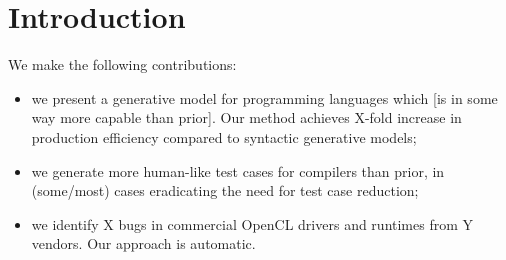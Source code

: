 \section{Introduction}\label{sec:intro}

We make the following contributions:
%
\begin{itemize}
\item we present a generative model for programming languages which [is in some way more capable than prior]. Our method achieves X-fold increase in production efficiency compared to syntactic generative models;
\item we generate more human-like test cases for compilers than prior, in (some/most) cases eradicating the need for test case reduction;
\item we identify X bugs in commercial OpenCL drivers and runtimes from Y vendors. Our approach is automatic.
\end{itemize}
